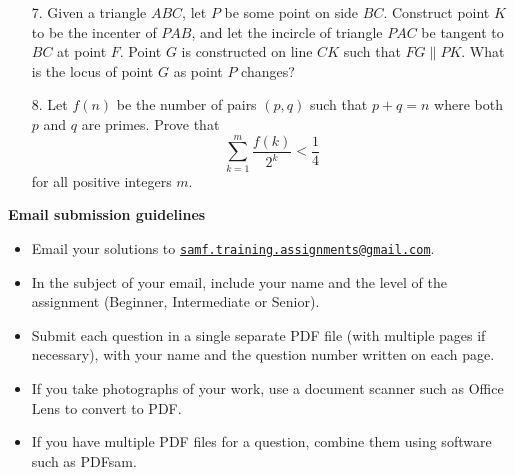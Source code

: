 \documentclass{article}
\begin{document}
\begin{enumerate}
\medskip
\item[7.] %
Given a triangle $ABC$, let $P$ be some point on side $BC$. Construct point $K$ to be the incenter of $PAB$, and let the incircle of triangle $PAC$ be tangent to $BC$ at point $F$. Point $G$ is constructed on line $CK$ such that $FG \parallel PK$. What is the locus of point $G$ as point $P$ changes?

\medskip
\item[8.] %
Let $f(n)$ be the number of pairs $(p, q)$ such that $p + q = n$ where both $p$ and $q$ are primes. Prove that
$$\sum_{k = 1}^{m} \frac{f(k)}{2^k} < \frac{1}{4}$$
for all positive integers $m$.


\end{enumerate}


\vfill
\textbf{\Large Email submission guidelines}
\begin{itemize}
	\item Email your solutions to \href{mailto:samf.training.assignments@gmail.com}{\texttt{samf.training.assignments@gmail.com}}.
	\item In the subject of your email, include your name and the level of the assignment (Beginner, Intermediate or Senior).
	\item Submit each question in a single separate PDF file (with multiple pages if necessary), with your name and the question number written on each page.
	\item If you take photographs of your work, use a document scanner such as Office Lens to convert to PDF.
	\item If you have multiple PDF files for a question, combine them using software such as PDFsam.
\end{itemize}
\end{document}
